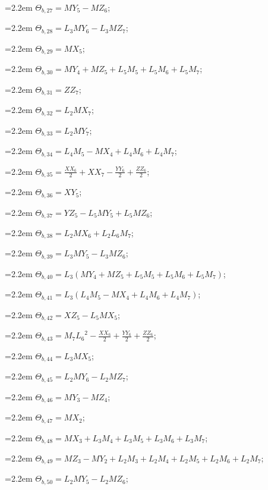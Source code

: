 {\hangindent=2.2em $\Theta_{b,27}=MY_{5}-MZ_{6}$;\par
\hangindent=2.2em $\Theta_{b,28}=L_{3}MY_{6}-L_{3}MZ_{7}$;\par
\hangindent=2.2em $\Theta_{b,29}=MX_{5}$;\par
\hangindent=2.2em $\Theta_{b,30}=MY_{4}+MZ_{5}+L_{5}M_{5}+L_{5}M_{6}+L_{5}M_{7}$;\par
\hangindent=2.2em $\Theta_{b,31}=ZZ_{7}$;\par
\hangindent=2.2em $\Theta_{b,32}=L_{2}MX_{7}$;\par
\hangindent=2.2em $\Theta_{b,33}=L_{2}MY_{7}$;\par
\hangindent=2.2em $\Theta_{b,34}=L_{4}M_{5}-MX_{4}+L_{4}M_{6}+L_{4}M_{7}$;\par
\hangindent=2.2em $\Theta_{b,35}=\tfrac{XX_{6}}{2}+XX_{7}-\tfrac{YY_{6}}{2}+\tfrac{ZZ_{6}}{2}$;\par
\hangindent=2.2em $\Theta_{b,36}=XY_{5}$;\par
\hangindent=2.2em $\Theta_{b,37}=YZ_{5}-L_{5}MY_{5}+L_{5}MZ_{6}$;\par
\hangindent=2.2em $\Theta_{b,38}=L_{2}MX_{6}+L_{2}L_{6}M_{7}$;\par
\hangindent=2.2em $\Theta_{b,39}=L_{3}MY_{5}-L_{3}MZ_{6}$;\par
\hangindent=2.2em $\Theta_{b,40}=L_{3}(MY_{4}+MZ_{5}+L_{5}M_{5}+L_{5}M_{6}+L_{5}M_{7})$;\par
\hangindent=2.2em $\Theta_{b,41}=L_{3}(L_{4}M_{5}-MX_{4}+L_{4}M_{6}+L_{4}M_{7})$;\par
\hangindent=2.2em $\Theta_{b,42}=XZ_{5}-L_{5}MX_{5}$;\par
\hangindent=2.2em $\Theta_{b,43}=M_{7}{L_{6}}^2-\tfrac{XX_{6}}{2}+\tfrac{YY_{6}}{2}+\tfrac{ZZ_{6}}{2}$;\par
\hangindent=2.2em $\Theta_{b,44}=L_{3}MX_{5}$;\par
\hangindent=2.2em $\Theta_{b,45}=L_{2}MY_{6}-L_{2}MZ_{7}$;\par
\hangindent=2.2em $\Theta_{b,46}=MY_{3}-MZ_{4}$;\par
\hangindent=2.2em $\Theta_{b,47}=MX_{2}$;\par
\hangindent=2.2em $\Theta_{b,48}=MX_{3}+L_{3}M_{4}+L_{3}M_{5}+L_{3}M_{6}+L_{3}M_{7}$;\par
\hangindent=2.2em $\Theta_{b,49}=MZ_{3}-MY_{2}+L_{2}M_{3}+L_{2}M_{4}+L_{2}M_{5}+L_{2}M_{6}+L_{2}M_{7}$;\par
\hangindent=2.2em $\Theta_{b,50}=L_{2}MY_{5}-L_{2}MZ_{6}$;\par
}
